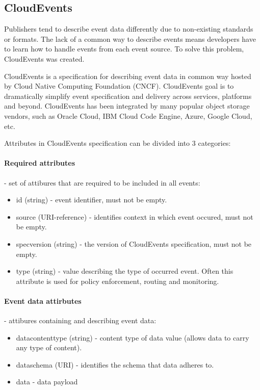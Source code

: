     \subsection{CloudEvents}
    Publishers tend to describe event data differently due to non-existing standards or formats. The lack of a common way to describe events means developers have to learn how to handle events from each event source. To solve this problem, CloudEvents was created.

    CloudEvents is a specification for describing event data in common way\cite{eventCloudEvents} hosted by Cloud Native Computing Foundation (CNCF)\cite{eventCNCF}. CloudEvents goal is to dramatically simplify event specification and delivery across services, platforms and beyond.
    CloudEvents has been integrated by many popular object storage vendors, such as Oracle Cloud, IBM Cloud Code Engine, Azure, Google Cloud, etc.

    Attributes in CloudEvents specification can be divided into 3 categories:
    \paragraph{Required attributes} - set of attibures that are required to be included in all events\cite{eventCloudEventsSpec}:
    \begin{itemize}
        \item id (string) - event identifier, must not be empty.
        \item source (URI-reference) - identifies context in which event occured, must not be empty.
        \item specversion (string) - the version of CloudEvents specification, must not be empty.
        \item type (string) - value describing the type of occurred event. Often this attribute is used for policy enforcement, routing and monitoring.
    \end{itemize}

    \paragraph{Event data attirbutes} - attibures containing and describing event data:
    \begin{itemize}
        \item datacontenttype (string) - content type of data value (allows data to carry any type of content).
        \item dataschema (URI) - identifies the schema that data adheres to.
        \item data - data payload
    \end{itemize}

